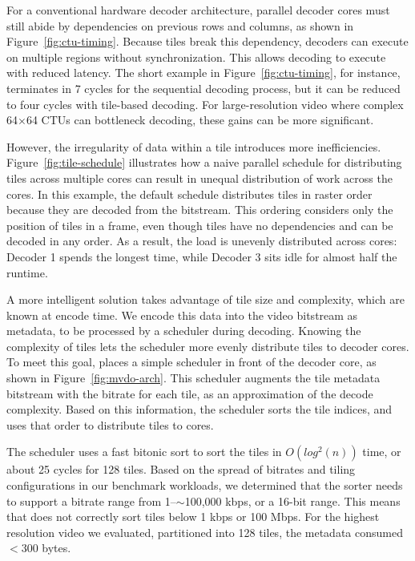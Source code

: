 For a conventional hardware decoder architecture, parallel decoder cores must still abide by dependencies on previous rows and columns, as shown in Figure~\ref{fig:ctu-timing}.
Because tiles break this dependency, decoders can execute on multiple regions without synchronization.
This allows decoding to execute with reduced latency.
The short example in Figure~\ref{fig:ctu-timing}, for instance, terminates in 7 cycles for the sequential decoding process, but it can be reduced to four cycles with tile-based decoding.
For large-resolution video where complex 64$\times$64 CTUs can bottleneck decoding, these gains can be more significant.

However, the irregularity of data within a tile introduces more inefficiencies.
Figure~\ref{fig:tile-schedule} illustrates how a naive parallel schedule for distributing tiles across multiple cores can result in unequal distribution of work across the cores.
In this example, the default schedule distributes tiles in raster order because they are decoded from the \hevc bitstream.
This ordering considers only the position of tiles in a frame, even though tiles have no dependencies and can be decoded in any order.
As a result, the load is unevenly distributed across cores: Decoder 1 spends the longest time, while Decoder 3 sits idle for almost half the runtime.

A more intelligent solution takes advantage of tile size and complexity, which are known at encode time.
We encode this data into the video bitstream as metadata, to be processed by a scheduler during decoding.
Knowing the complexity of tiles lets the scheduler more evenly distribute tiles to decoder cores.
To meet this goal, \nameArch places a simple scheduler in front of the decoder core, as shown in Figure~\ref{fig:mvdo-arch}.
This scheduler augments the tile metadata bitstream with the bitrate for each tile, as an approximation of the decode complexity.
Based on this information, the scheduler sorts the tile indices, and uses that order to distribute tiles to cores.

\coresVsDecodeSpeedupFigure


The scheduler uses a fast bitonic sort to sort the tiles in $O(log^2(n))$ time, or about 25 cycles for 128 tiles.
Based on the spread of bitrates and tiling configurations in our benchmark workloads, we determined that the sorter needs to support a bitrate range from 1--$\sim$100,000 kbps, or a 16-bit range.
This means that \nameArch does not correctly sort tiles below 1 kbps or 100 Mbps.
For the highest resolution video we evaluated, partitioned into 128 tiles, the metadata consumed $<300$ bytes.

